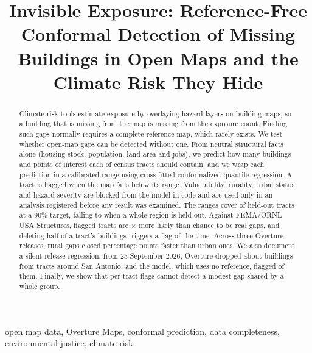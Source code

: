\documentclass[conference]{IEEEtran}
\begin{document}
\title{Invisible Exposure: Reference-Free Conformal Detection of Missing Buildings in Open Maps and the Climate Risk They Hide}

\author{
}

\maketitle

\begin{abstract}
Climate-risk tools estimate exposure by overlaying hazard layers on building maps, so a building that is missing from the map is missing from the exposure count. Finding such gaps normally requires a complete reference map, which rarely exists. We test whether open-map gaps can be detected without one. From neutral structural facts alone (housing stock, population, land area and jobs), we predict how many buildings and points of interest each of \NTracts{} census tracts should contain, and we wrap each prediction in a calibrated range using cross-fitted conformalized quantile regression. A tract is flagged when the map falls below its range. Vulnerability, rurality, tribal status and hazard severity are blocked from the model in code and are used only in an analysis registered before any result was examined. The ranges cover \CovBldg{} of held-out tracts at a 90\% target, falling to \CovLoroBldg{} when a whole region is held out. Against FEMA/ORNL USA Structures, flagged tracts are \LiftBldg{}$\times$ more likely than chance to be real gaps, and deleting half of a tract's buildings triggers a flag \DelFiftyBldg{} of the time. Across three Overture releases, rural gaps closed \DidRuralPP{} percentage points faster than urban ones. We also document a silent release regression: from 23 September 2026, Overture dropped about \EOneLost{} buildings from \EOneTracts{} tracts around San Antonio, and the model, which uses no reference, flagged \EOneFlagAfter{} of them. Finally, we show that per-tract flags cannot detect a modest gap shared by a whole group.
\end{abstract}

\begin{IEEEkeywords}
open map data, Overture Maps, conformal prediction, data completeness, environmental justice, climate risk
\end{IEEEkeywords}
\end{document}
